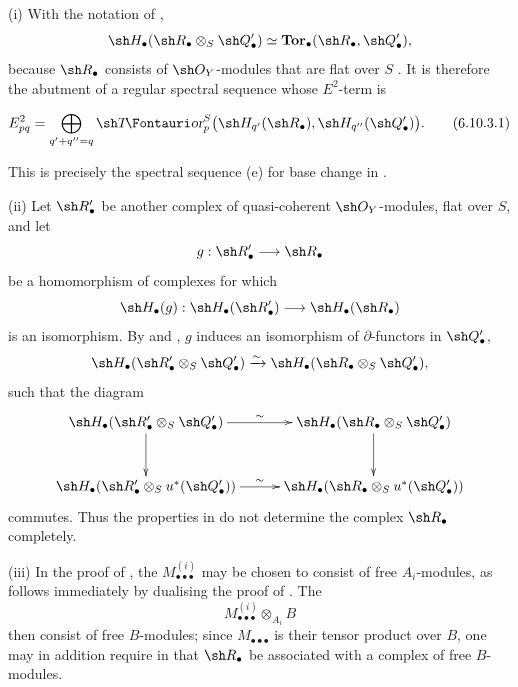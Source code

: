 \begin{remarks}[6.10.3]
\label{III.6.10.3}
\textnormal{(i)}
With the notation of ,
\[
  \sh H_\bullet
  (\sh R_\bullet\otimes_S\sh Q_\bullet')
  \simeq
  \mathbf{Tor}_\bullet(\sh R_\bullet,\sh Q_\bullet'),
\]
because $\sh R_\bullet$ consists of $\sh O_Y$-modules that are
flat over $S$ .  It is therefore
 the abutment of a regular spectral sequence
whose $E^2$-term is
\begin{env}[6.10.3.1]
\label{III.6.10.3.1}
\[
  E^2_{pq}
  =
  \bigoplus_{q'+q''=q}
  \shTor_p^S
  \bigl(
    \sh H_{q'}(\sh R_\bullet),
    \sh H_{q''}(\sh Q_\bullet')
  \bigr).
  \tag{6.10.3.1}\label{III.6.10.3.1.eq}
\]
\end{env}
This is precisely the spectral sequence (e) for base change in
.

\medskip
\textnormal{(ii)}
Let $\sh R_\bullet'$ be another complex of quasi-coherent
$\sh O_Y$-modules, flat over $S$, and let
\[
  g:\sh R_\bullet'\longrightarrow\sh R_\bullet
\]
be a homomorphism of complexes for which
\[
  \sh H_\bullet(g):
  \sh H_\bullet(\sh R_\bullet')
  \longrightarrow
  \sh H_\bullet(\sh R_\bullet)
\]
is an isomorphism.  By  and
, $g$ induces an isomorphism of
$\partial$-functors in $\sh Q_\bullet'$,
\[
  \sh H_\bullet
  (\sh R_\bullet'\otimes_S\sh Q_\bullet')
  \xrightarrow{\sim}
  \sh H_\bullet
  (\sh R_\bullet\otimes_S\sh Q_\bullet'),
\]
such that the diagram
\[
\xymatrix@C=28pt@R=30pt{
  \sh H_\bullet
  (\sh R_\bullet'\otimes_S\sh Q_\bullet')
  \ar[r]^-{\sim}\ar[d]
  &
  \sh H_\bullet
  (\sh R_\bullet\otimes_S\sh Q_\bullet')
  \ar[d]
  \\
  \sh H_\bullet
  (\sh R_\bullet'\otimes_Su^*(\sh Q_\bullet'))
  \ar[r]^-{\sim}
  &
  \sh H_\bullet
  (\sh R_\bullet\otimes_Su^*(\sh Q_\bullet'))
}
\]
commutes.  Thus the properties in  do not
determine the complex $\sh R_\bullet$ completely.

\medskip
{}
\textnormal{(iii)}
In the proof of , the
$M_{\bullet\bullet\bullet}^{(i)}$ may be chosen to consist of
free $A_i$-modules, as follows immediately by dualising the
proof of .  The
\[
  M_{\bullet\bullet\bullet}^{(i)}\otimes_{A_i}B
\]
then consist of free $B$-modules; since
$M_{\bullet\bullet\bullet}$ is their tensor product over $B$,
one may in addition require in  that
$\sh R_\bullet$ be associated with a complex of free
$B$-modules.


\end{remarks}
